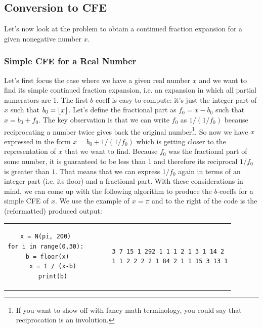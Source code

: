 




\subsection{Conversion to CFE}
Let's now look at the problem to obtain a continued fraction expansion for a given nonegative number $x$.


\subsubsection{Simple CFE for a Real Number}
Let's first focus the case where we have a given real number $x$ and we want to find its simple continued fraction expansion, i.e. an expansion in which all partial numerators are 1. The first $b$-coeff is easy to compute: it's just the integer part of $x$ such that $b_0 = \lfloor x\rfloor$. Let's define the fractional part as $f_0 = x - b_0$ such that $x = b_0 + f_0$. The key observation is that we can write $f_0$ as $1/(1/f_0)$ because reciprocating a number twice gives back the original number\footnote{If you want to show off with fancy math terminology, you could say that reciprocation is an involution.}. So now we have $x$ expressed in the form $x = b_0 + 1/(1/f_0)$ which is getting closer to the representation of $x$ that we want to find. Because $f_0$ was the fractional part of some number, it is guaranteed to be less than $1$ and therefore its reciprocal $1/f_0$ is greater than $1$. That means that we can express $1/f_0$ again in terms of an integer part (i.e. its floor) and a fractional part. With these considerations in mind, we can come up with the following algorithm to produce the $b$-coeffs for a simple CFE of $x$. We use the example of $x = \pi$ and to the right of the code is the (reformatted) produced output:
\begin{center}
\begin{tabular}{ ccccc } 
\begin{lstlisting}
x = N(pi, 200)
for i in range(0,30):
    b = floor(x)   
    x = 1 / (x-b)
    print(b)
\end{lstlisting}
& & \vline & &
\begin{lstlisting}
3 7 15 1 292 1 1 1 2 1 3 1 14 2 
1 1 2 2 2 2 1 84 2 1 1 15 3 13 1
\end{lstlisting}
\end{tabular}
\end{center}
